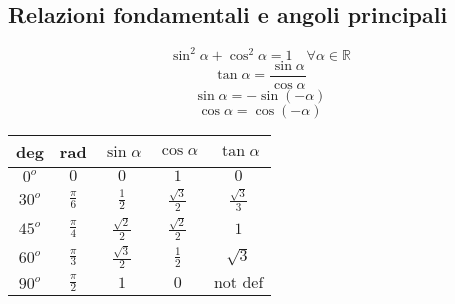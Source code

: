 \documentclass{article}
\begin{document}
  \subsection*{Relazioni fondamentali e angoli principali}
  \begin{minipage}[t][][b]{.45\textwidth}
    \begin{equation}
      \sin^2 \alpha + \cos^2 \alpha = 1 \quad \forall \alpha \in \mathbb{R}
    \end{equation}
    \begin{equation}
      \tan\alpha = \frac{\sin\alpha}{\cos\alpha}
    \end{equation}
    \begin{equation}
      \sin\alpha = - \sin(-\alpha)
    \end{equation}
    \begin{equation}
      \cos\alpha = \cos(-\alpha)
    \end{equation}
  \end{minipage}
  \begin{minipage}[t][][b]{.45\textwidth}
    \begin{flushright}
      \begin{tabular}{ | c | c | c | c | c | }
        \hline
        deg & rad & $\sin \alpha$ & $\cos\alpha$ & $\tan\alpha$ \\
        \hline
        $0^o$ & $0$ & $0$ & $1$ & $0$ \\
        $30^o$ & $\frac{\pi}{6}$ & $\frac{1}{2}$ & $\frac{\sqrt{3}}{2}$ & $\frac{\sqrt{3}}{3}$ \\
        $45^o$ & $\frac{\pi}{4}$ & $\frac{\sqrt{2}}{2}$ & $\frac{\sqrt{2}}{2}$ & $1$ \\
        $60^o$ & $\frac{\pi}{3}$ & $\frac{\sqrt{3}}{2}$ & $\frac{1}{2}$ & $\sqrt{3}$ \\
        $90^o$ & $\frac{\pi}{2}$ & $1$ & $0$ & $\text{not def}$ \\
        \hline
      \end{tabular}
    \end{flushright}
  \end{minipage}
\end{document}
